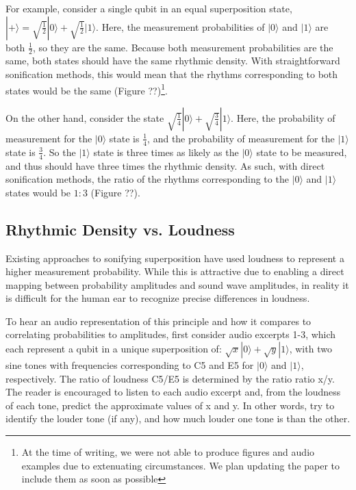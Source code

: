 \documentclass[10pt,twocolumn]{article}
\begin{document}
For example, consider a single qubit in an equal superposition state, $|+\rangle = \sqrt{\frac{1}{2}}|0\rangle + \sqrt{\frac{1}{2}}|1\rangle$. Here, the measurement probabilities of $|0\rangle$ and $|1\rangle$ are both $\frac{1}{2}$, so they are the same. Because both measurement probabilities are the same, both states should have the same rhythmic density. With straightforward sonification methods, this would mean that the rhythms corresponding to both states would be the same (Figure ??)\footnote{At the time of writing, we were not able to produce figures and audio examples due to extenuating circumstances. We plan updating the paper to include them as soon as possible}.

On the other hand, consider the state $\sqrt{\frac{1}{4}}|0\rangle + \sqrt{\frac{3}{4}}|1\rangle$. Here, the probability of measurement for the $|0\rangle$ state is $\frac{1}{4}$, and the probability of measurement for the $|1\rangle$ state is $\frac{3}{4}$. So the $|1\rangle$ state is three times as likely as the $|0\rangle$ state to be measured, and thus should have three times the rhythmic density.  As such, with direct sonification methods, the ratio of the rhythms corresponding to the $|0\rangle$ and $|1\rangle$ states would be $1:3$ (Figure ??).

\subsection{Rhythmic Density vs. Loudness}

Existing approaches to sonifying superposition have used loudness to represent a higher measurement probability\cite{qmuvi}. While this is attractive due to enabling a direct mapping between probability amplitudes and sound wave amplitudes, in reality it is difficult for the human ear to recognize precise differences in loudness\cite{kulkarni2001}.

To hear an audio representation of this principle and how it compares to correlating probabilities to amplitudes, first consider audio excerpts 1-3, which each represent a qubit in a unique superposition of: $\sqrt{x}|0\rangle + \sqrt{y}|1\rangle$, with two sine tones with frequencies corresponding to C5 and E5 for $|0\rangle$ and $|1\rangle$, respectively. The ratio of loudness C5/E5 is determined by the ratio ratio x/y. The reader is encouraged to listen to each audio excerpt and, from the loudness of each tone, predict the approximate values of x and y. In other words, try to identify the louder tone (if any), and how much louder one tone is than the other.
\end{document}
